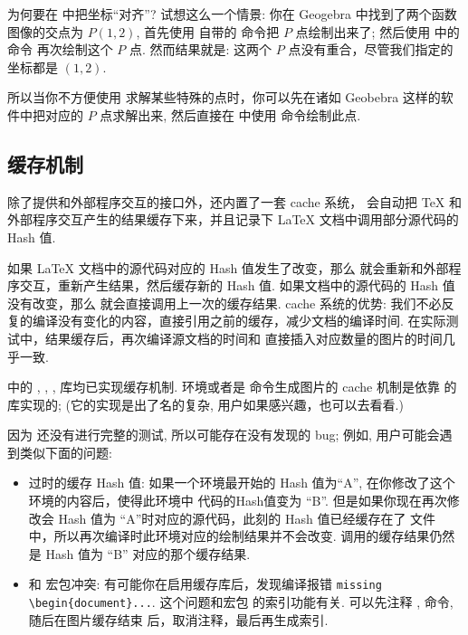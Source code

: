 \documentclass[
  hyper, lang=cn, 
  class=l3dox, 
]{../../zlatex/code/ztex}
\begin{document}
为何要在 \zTikZ{} 中把坐标``对齐''? 试想这么一个情景: 你在 Geogebra 中找到了两个函数图像的交点为 $P(1, 2)$,
首先使用 \TikZ{} 自带的 \cmd{\filldraw} 命令把 $P$ 点绘制出来了; 然后使用 \zTikZ{} 中的 \cmd{\ShowPoint} 命令
再次绘制这个 $P$ 点. 然而结果就是: 这两个 $P$ 点没有重合，尽管我们指定的坐标都是 $(1, 2)$.

所以当你不方便使用 \zTikZ{} 求解某些特殊的点时，你可以先在诸如 Geobebra 这样的软件中把对应的 $P$ 
点求解出来, 然后直接在 \zTikZ{} 中使用 \cmd{\ShowPoint} 命令绘制此点.


\subsection{缓存机制}
\zTikZ{} 除了提供和外部程序交互的接口外，还内置了一套 cache 系统，\zTikZ{} 会自动把 \TeX{} 和
外部程序交互产生的结果缓存下来，并且记录下 \LaTeX{} 文档中调用部分源代码的 Hash 值. 

如果 \LaTeX{} 文档中的源代码对应的 Hash 值发生了改变，那么 \zTikZ{} 就会重新和外部程序交互，重新产生结果，然后缓存新的 Hash 值.
如果文档中的源代码的 Hash 值没有改变，那么 \zTikZ{} 就会直接调用上一次的缓存结果. cache 系统的优势:
我们不必反复的编译没有变化的内容，直接引用之前的缓存，减少文档的编译时间. 在实际测试中，结果缓存后，再次编译源文档的时间和
直接插入对应数量的图片的时间几乎一致.

\zTikZ{} 中的 , , ,  库均已实现缓存机制. 
 环境或者是 \cmd{\tikz} 命令生成图片的 cache 机制是依靠 \TikZ{} 的  
库实现的; (它的实现是出了名的复杂, 用户如果感兴趣，也可以去看看.)


因为 \ztikz{} 还没有进行完整的测试, 所以可能存在没有发现的 bug; 例如, 用户可能会遇到类似下面的问题:
\begin{itemize}
  \item 过时的缓存 Hash 值: 如果一个环境最开始的 Hash 值为``A'', 在你修改了这个环境的内容后，使得此环境中
    代码的Hash值变为 ``B''. 但是如果你现在再次修改会 Hash 值为 ``A''时对应的源代码，此刻的 Hash 值已经缓存在了
    文件  中，所以再次编译时此环境对应的绘制结果并不会改变. 调用的缓存结果仍然是 Hash 值为 ``B''
    对应的那个缓存结果. 
  \item 和  宏包冲突: 有可能你在启用缓存库后，发现编译报错 \texttt{missing \textbackslash begin\{document\}...}. 
    这个问题和宏包  的索引功能有关. 可以先注释 ,  命令, 随后在图片缓存结束
    后，取消注释，最后再生成索引.
\end{itemize}
\end{document}
